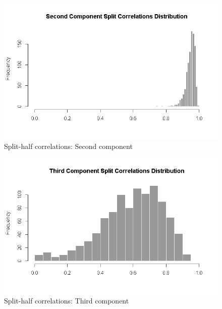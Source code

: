 \documentclass[
  ignorenonframetext,
]{beamer}
\begin{document}
\begin{frame}

\begin{figure}
\centering
\includegraphics{../Images/split2.png}
\caption{Split-half correlations: Second component}
\end{figure}

\end{frame}

\begin{frame}

\begin{figure}
\centering
\includegraphics{../Images/split3.png}
\caption{Split-half correlations: Third component}
\end{figure}

\end{frame}
\end{document}
